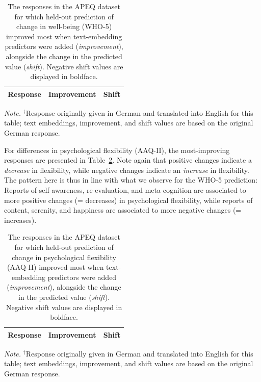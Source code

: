 \documentclass[man,floatsintext]{apa7}
\newcommand{\change}[1]{#1}
\begin{document}
\begin{table}[!htbp]
\centering
\caption{The  responses in the APEQ dataset for which \change{held-out} prediction of change in well-being (WHO-5) improved most when text-embedding predictors were added (\emph{improvement}), alongside the change in the predicted value (\emph{shift}). Negative shift values are displayed in boldface. } 
\label{tab:examples_APEQ}
\scriptsize
\begin{threeparttable}
\begin{tabular}{p{12cm}rr}
 \hline
Response & Improvement & Shift \\
  \hline

\end{tabular}
\begin{tablenotes}[flushleft]
\item \textit{Note.} $^{\dagger}$Response originally given in German and translated into English for this table; text embeddings, improvement, and shift values are based on the original German response.
\end{tablenotes}
\end{threeparttable}
\end{table}

For differences in psychological flexibility (AAQ-II), the most-improving responses are presented in Table~\ref{tab:examples_APEQ_AAQ}. \change{Note again that positive changes indicate a \emph{decrease} in flexibility, while negative changes indicate an \emph{increase} in flexibility.} The pattern here \change{is thus in line with what we observe for} the WHO-5 prediction: Reports of self-awareness, re-evaluation, and meta-cognition are associated to more positive changes \change{(= decreases)} in psychological flexibility, while reports of content, serenity, and happiness are associated to more negative changes \change{(= increases)}. 

\begin{table}[!htbp]
\centering
\caption{The  responses in the APEQ dataset for which \change{held-out} prediction of change in psychological flexibility (AAQ-II) improved most when text-embedding predictors were added (\emph{improvement}), alongside the change in the predicted value (\emph{shift}). Negative shift values are displayed in boldface. }
\label{tab:examples_APEQ_AAQ}
\begingroup\scriptsize
\begin{threeparttable}
\begin{tabular}{p{12cm}rr}
  \hline
Response & Improvement & Shift \\
  \hline

   \end{tabular}
\begin{tablenotes}[flushleft]
\item \textit{Note.} $^{\dagger}$Response originally given in German and translated into English for this table; text embeddings, improvement, and shift values are based on the original German response.
\end{tablenotes}
\end{threeparttable}
\endgroup
\end{table}
\end{document}
